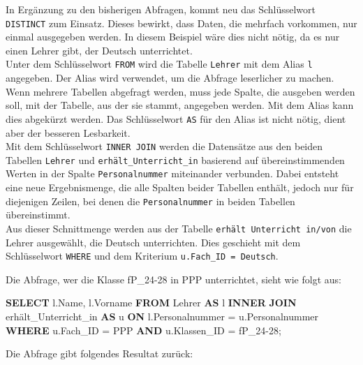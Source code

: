\documentclass[
  nswissgerman,
  a4paper,
  DIV=11,
  numbers=noendperiod,
  ngerman]{scrreprt}
\newenvironment{Shaded}{\begin{snugshade}}{\end{snugshade}}
\newcommand{\KeywordTok}[1]{\textcolor[rgb]{0.00,0.23,0.31}{\textbf{#1}}}
\newcommand{\NormalTok}[1]{\textcolor[rgb]{0.00,0.23,0.31}{#1}}
\newcommand{\OperatorTok}[1]{\textcolor[rgb]{0.37,0.37,0.37}{#1}}
\newcommand{\StringTok}[1]{\textcolor[rgb]{0.13,0.47,0.30}{#1}}
\begin{document}
In Ergänzung zu den bisherigen Abfragen, kommt neu das Schlüsselwort
\texttt{DISTINCT} zum Einsatz. Dieses bewirkt, dass Daten, die mehrfach
vorkommen, nur einmal ausgegeben werden. In diesem Beispiel wäre dies
nicht nötig, da es nur einen Lehrer gibt, der Deutsch unterrichtet.\\
Unter dem Schlüsselwort \texttt{FROM} wird die Tabelle \texttt{Lehrer}
mit dem Alias \texttt{l} angegeben. Der Alias wird verwendet, um die
Abfrage leserlicher zu machen. Wenn mehrere Tabellen abgefragt werden,
muss jede Spalte, die ausgeben werden soll, mit der Tabelle, aus der sie
stammt, angegeben werden. Mit dem Alias kann dies abgekürzt werden. Das
Schlüsselwort \texttt{AS} für den Alias ist nicht nötig, dient aber der
besseren Lesbarkeit.\\
Mit dem Schlüsselwort \texttt{INNER\ JOIN} werden die Datensätze aus den
beiden Tabellen \texttt{Lehrer} und \texttt{erhält\_Unterricht\_in}
basierend auf übereinstimmenden Werten in der Spalte
\texttt{Personalnummer} miteinander verbunden. Dabei entsteht eine neue
Ergebnismenge, die alle Spalten beider Tabellen enthält, jedoch nur für
diejenigen Zeilen, bei denen die \texttt{Personalnummer} in beiden
Tabellen übereinstimmt.\\
Aus dieser Schnittmenge werden aus der Tabelle
\texttt{erhält\ Unterricht\ in/von} die Lehrer ausgewählt, die Deutsch
unterrichten. Dies geschieht mit dem Schlüsselwort \texttt{WHERE} und
dem Kriterium
\texttt{u.Fach\_ID\ =\ \textquotesingle{}Deutsch\textquotesingle{}}.

Die Abfrage, wer die Klasse fP\_24-28 in PPP unterrichtet, sieht wie
folgt aus:

\begin{Shaded}
\begin{Highlighting}[numbers=left,,]
\KeywordTok{SELECT}\NormalTok{ l.Name, l.Vorname}
\KeywordTok{FROM}\NormalTok{ Lehrer }\KeywordTok{AS}\NormalTok{ l}
\KeywordTok{INNER} \KeywordTok{JOIN}\NormalTok{ erhält\_Unterricht\_in }\KeywordTok{AS}\NormalTok{ u }\KeywordTok{ON}\NormalTok{ l.Personalnummer }\OperatorTok{=}\NormalTok{ u.Personalnummer}
\KeywordTok{WHERE}\NormalTok{ u.Fach\_ID }\OperatorTok{=} \StringTok{\textquotesingle{}PPP\textquotesingle{}} 
\KeywordTok{AND}\NormalTok{ u.Klassen\_ID }\OperatorTok{=} \StringTok{\textquotesingle{}fP\_24{-}28\textquotesingle{}}\NormalTok{;}
\end{Highlighting}
\end{Shaded}

Die Abfrage gibt folgendes Resultat zurück:
\end{document}
